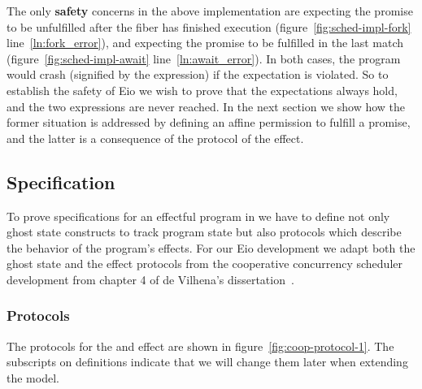 The only \textbf{safety} concerns in the above implementation are  expecting the promise to be unfulfilled after the fiber has finished execution (figure~\ref{fig:sched-impl-fork} line~\ref{ln:fork_error}),
and  expecting the promise to be fulfilled in the last match (figure~\ref{fig:sched-impl-await} line~\ref{ln:await_error}).
In both cases, the program would crash (signified by the  expression) if the expectation is violated.
So to establish the safety of Eio we wish to prove that the expectations always hold, and the two  expressions are never reached.
In the next section we show how the former situation is addressed by defining an affine permission to fulfill a promise, and the latter is a consequence of the protocol of the \esuspend{} effect.

\subsection{Specification}
\label{sec:sched-spec}

To prove specifications for an effectful program in \hazel{} we have to define not only ghost state constructs to track program state but also protocols which describe the behavior of the program's effects.
For our Eio development we adapt both the ghost state and the effect protocols from the cooperative concurrency scheduler development from chapter 4 of de Vilhena's dissertation~\cite{de2022proof}.

\subsubsection{Protocols}
\label{sec:sched-spec-protocols}

The protocols for the \efork{} and \esuspend{} effect are shown in figure~\ref{fig:coop-protocol-1}.
The subscripts on definitions indicate that we will change them later when extending the model.

